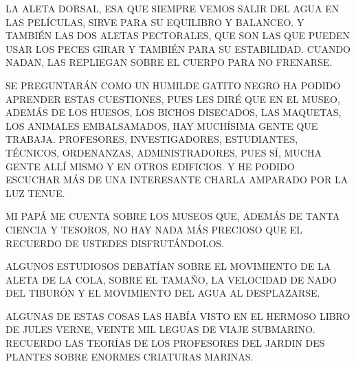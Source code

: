 LA ALETA DORSAL, ESA QUE SIEMPRE VEMOS SALIR DEL AGUA EN LAS PELÍCULAS, SIRVE PARA SU EQUILIBRO Y BALANCEO. Y TAMBIÉN LAS DOS ALETAS PECTORALES, QUE SON LAS QUE PUEDEN USAR LOS PECES GIRAR Y TAMBIÉN PARA SU ESTABILIDAD. CUANDO NADAN, LAS REPLIEGAN SOBRE EL CUERPO PARA NO FRENARSE.

SE PREGUNTARÁN COMO UN HUMILDE GATITO NEGRO HA PODIDO APRENDER ESTAS CUESTIONES, PUES LES DIRÉ QUE EN EL MUSEO, ADEMÁS DE LOS HUESOS, LOS BICHOS DISECADOS, LAS MAQUETAS, LOS ANIMALES EMBALSAMADOS, HAY MUCHÍSIMA GENTE QUE TRABAJA. PROFESORES, INVESTIGADORES, ESTUDIANTES, TÉCNICOS, ORDENANZAS, ADMINISTRADORES, PUES SÍ, MUCHA GENTE ALLÍ MISMO Y EN OTROS EDIFICIOS. Y HE PODIDO ESCUCHAR MÁS DE UNA INTERESANTE CHARLA AMPARADO POR LA LUZ TENUE.


\newpage
{}
MI PAPÁ ME CUENTA SOBRE LOS MUSEOS QUE, ADEMÁS DE TANTA CIENCIA Y TESOROS, NO HAY NADA MÁS PRECIOSO QUE EL RECUERDO DE USTEDES DISFRUTÁNDOLOS.

\begin{center}

\begin{minipage}[r]{.7\textwidth}%
\end{minipage}

\end{center}


\newpage
{}

ALGUNOS ESTUDIOSOS DEBATÍAN SOBRE EL MOVIMIENTO DE LA ALETA DE LA COLA, SOBRE EL TAMAÑO, LA VELOCIDAD DE NADO DEL TIBURÓN Y EL MOVIMIENTO DEL AGUA AL DESPLAZARSE.

\begin{minipage}[r]{.45\textwidth}%
\end{minipage}\hfill
\begin{minipage}[r]{.45\textwidth}%
ALGUNAS DE ESTAS COSAS LAS HABÍA VISTO EN EL HERMOSO LIBRO DE JULES VERNE, VEINTE MIL LEGUAS DE VIAJE SUBMARINO. RECUERDO LAS TEORÍAS DE LOS PROFESORES DEL JARDIN DES PLANTES   SOBRE ENORMES CRIATURAS MARINAS.		
\end{minipage}	

